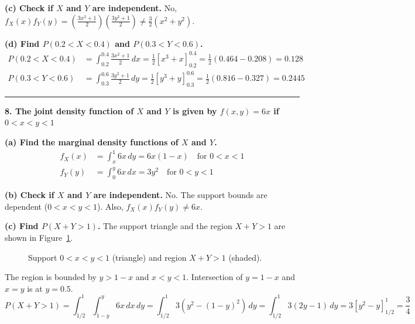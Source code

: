 \documentclass{article}
\begin{document}
\textbf{(c) Check if $X$ and $Y$ are independent.}
No, $f_X(x)f_Y(y) = \left(\frac{3x^2+1}{2}\right)\left(\frac{3y^2+1}{2}\right) \neq \frac{3}{2}(x^2+y^2)$.

\textbf{(d) Find $P(0.2 < X < 0.4)$ and $P(0.3 < Y < 0.6)$.}
\begin{align*}
P(0.2 < X < 0.4) &= \int_{0.2}^{0.4} \frac{3x^2+1}{2} \,dx = \frac{1}{2}\left[x^3+x\right]_{0.2}^{0.4} = \frac{1}{2}(0.464 - 0.208) = 0.128 \\
P(0.3 < Y < 0.6) &= \int_{0.3}^{0.6} \frac{3y^2+1}{2} \,dy = \frac{1}{2}\left[y^3+y\right]_{0.3}^{0.6} = \frac{1}{2}(0.816 - 0.327) = 0.2445
\end{align*}

\vspace{1em}
\hrule
\vspace{1em}

\textbf{8. The joint density function of $X$ and $Y$ is given by $f(x, y) = 6x$ if $0 < x < y < 1$}

\textbf{(a) Find the marginal density functions of $X$ and $Y$.}
\begin{align*}
f_X(x) &= \int_{x}^{1} 6x \,dy = 6x(1-x) \quad \text{for } 0 < x < 1 \\
f_Y(y) &= \int_{0}^{y} 6x \,dx = 3y^2 \quad \text{for } 0 < y < 1
\end{align*}

\textbf{(b) Check if $X$ and $Y$ are independent.}
No. The support bounds are dependent ($0 < x < y < 1$). Also, $f_X(x)f_Y(y) \neq 6x$.

\textbf{(c) Find $P(X +Y > 1)$.}
The support triangle and the region $X+Y>1$ are shown in Figure~\ref{fig:8}.
\begin{figure}[H]
\centering
{}
\caption{Support $0<x<y<1$ (triangle) and region $X+Y>1$ (shaded).}
\label{fig:8}
\end{figure}
The region is bounded by $y > 1-x$ and $x < y < 1$. Intersection of $y=1-x$ and $x=y$ is at $y=0.5$.
$$P(X+Y > 1) = \int_{1/2}^{1} \int_{1-y}^{y} 6x \,dx \,dy = \int_{1/2}^{1} 3(y^2 - (1-y)^2) \,dy = \int_{1/2}^{1} 3(2y - 1) \,dy = 3\left[y^2 - y\right]_{1/2}^1 = \frac{3}{4}$$
\end{document}
